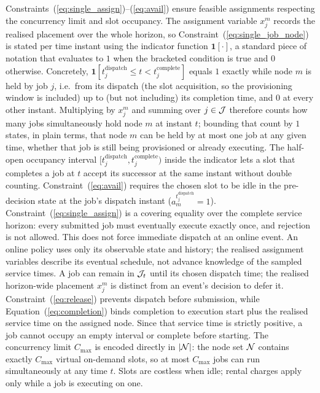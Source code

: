 Constraints~(\ref{eq:single_assign})--(\ref{eq:avail}) ensure feasible assignments respecting the concurrency limit and slot occupancy. The assignment variable $x_j^m$ records the realised placement over the whole horizon, so Constraint~(\ref{eq:single_job_node}) is stated per time instant using the indicator function $\mathbf{1}[\cdot]$, a standard piece of notation that evaluates to $1$ when the bracketed condition is true and $0$ otherwise. Concretely, $\mathbf{1}\!\left[t_j^{\text{dispatch}} \leq t < t_j^{\text{complete}}\right]$ equals $1$ exactly while node $m$ is held by job $j$, i.e.\ from its dispatch (the slot acquisition, so the provisioning window is included) up to (but not including) its completion time, and $0$ at every other instant. Multiplying by $x_j^m$ and summing over $j \in \mathcal{J}$ therefore counts how many jobs simultaneously hold node $m$ at instant $t$; bounding that count by $1$ states, in plain terms, that node $m$ can be held by at most one job at any given time, whether that job is still being provisioned or already executing. The half-open occupancy interval $[t_j^{\text{dispatch}}, t_j^{\text{complete}})$ inside the indicator lets a slot that completes a job at $t$ accept its successor at the same instant without double counting. Constraint~(\ref{eq:avail}) requires the chosen slot to be idle in the pre-decision state at the job's dispatch instant ($a_m^{t_j^{\text{dispatch}}} = 1$). Constraint~(\ref{eq:single_assign}) is a covering equality over the complete service horizon: every submitted job must eventually execute exactly once, and rejection is not allowed. This does not force immediate dispatch at an online event. An online policy uses only its observable state and history; the realised assignment variables describe its eventual schedule, not advance knowledge of the sampled service times. A job can remain in $\mathcal{J}_t$ until its chosen dispatch time; the realised horizon-wide placement $x_j^m$ is distinct from an event's decision to defer it. Constraint~(\ref{eq:release}) prevents dispatch before submission, while Equation~(\ref{eq:completion}) binds completion to execution start plus the realised service time on the assigned node. Since that service time is strictly positive, a job cannot occupy an empty interval or complete before starting. The concurrency limit $C_{\max}$ is encoded directly in $|\mathcal{N}|$: the node set $\mathcal{N}$ contains exactly $C_{\max}$ virtual on-demand slots, so at most $C_{\max}$ jobs can run simultaneously at any time $t$. Slots are costless when idle; rental charges apply only while a job is executing on one.

